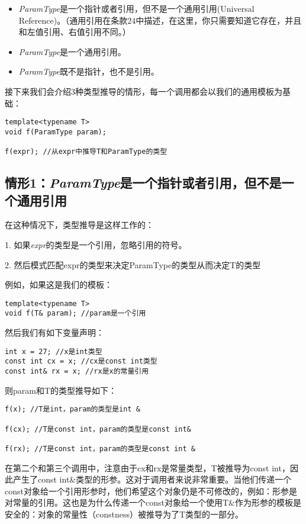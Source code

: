 \begin{itemize}
\item{\textit{ParamType}是一个指针或者引用，但不是一个通用引用(Universal Reference)。（通用引用在条款24中描述，在这里，你只需要知道它存在，并且和左值引用、右值引用不同。）}
\item{\textit{ParamType}是一个通用引用。}
\item{\textit{ParamType}既不是指针，也不是引用。}
\end{itemize}

接下来我们会介绍3种类型推导的情形，每一个调用都会以我们的通用模板为基础：

\begin{lstlisting}
template<typename T>
void f(ParamType param);

f(expr); //从expr中推导T和ParamType的类型
\end{lstlisting}

\subsection*{情形1：\textit{ParamType}是一个指针或者引用，但不是一个通用引用}
在这种情况下，类型推导是这样工作的：

1. 如果\textit{expr}的类型是一个引用，忽略引用的符号。

2. 然后模式匹配expr的类型来决定ParamType的类型从而决定T的类型

例如，如果这是我们的模板：
\begin{lstlisting}
template<typename T>
void f(T& param); //param是一个引用
\end{lstlisting}
然后我们有如下变量声明：
\begin{lstlisting}
int x = 27; //x是int类型
const int cx = x; //cx是const int类型
const int& rx = x; //rx是x的常量引用
\end{lstlisting}

则param和T的类型推导如下：
\begin{lstlisting}
f(x); //T是int，param的类型是int &

f(cx); //T是const int，param的类型是const int&

f(rx); //T是const int，param的类型是const int &
\end{lstlisting}

在第二个和第三个调用中，注意由于cx和rx是常量类型，T被推导为const int，因此产生了const int\&类型的形参。这对于调用者来说非常重要。当他们传递一个const对象给一个引用形参时，他们希望这个对象仍是不可修改的，例如：形参是对常量的引用。这也是为什么传递一个const对象给一个使用T\&作为形参的模板是安全的：对象的常量性（constness）被推导为了T类型的一部分。

